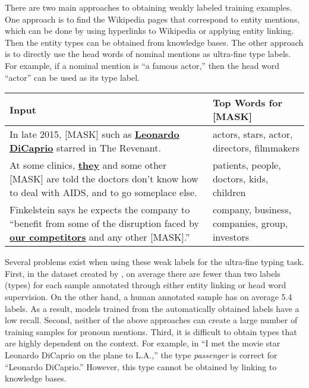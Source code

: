 \documentclass[11pt,a4paper]{article}
\begin{document}
There are two main approaches to obtaining weakly labeled training {examples}. One approach is to find the Wikipedia pages that correspond to entity mentions, which can be done by using hyperlinks to Wikipedia or applying entity linking. Then the entity types can be obtained from knowledge bases. The other approach is to directly use the head words of nominal mentions as ultra-fine type labels.
For example, if a nominal mention is ``a famous actor,'' then the head word ``actor'' can be used as its type label.

\begin{table*}
\centering
\begin{tabular}{p{10.2cm}p{4.7cm}}
\hline \textbf{Input} & \textbf{Top Words for [MASK]} \\ \hline
In late 2015, \colorbox{blue!30}{[MASK] such as} \underline{\textbf{Leonardo DiCaprio}} starred in The Revenant. & actors, stars, actor, directors, filmmakers \\
\hline
At some clinics, \underline{\textbf{they}} \colorbox{blue!30}{and some other [MASK]} are told the doctors don't know how to deal with AIDS, and to go someplace else. & patients, people, doctors, kids, children \\ \hline
Finkelstein says he expects the company to ``benefit from some of the disruption faced by \underline{\textbf{our competitors}} \colorbox{blue!30}{and any other [MASK]}.'' & company, business, companies, group, investors \\ \hline
\end{tabular}
\caption{\label{tab:weak-examples} Examples of constructed BERT MLM inputs for obtaining weak entity typing labels. Entity mentions are in bold and underlined. The texts highlighted with blue background are not in the original sentences. They are inserted to create inputs for BERT. The right column lists the five most probable words predicted by a pretrained BERT-Base-Cased MLM.}
\end{table*}

{Several problems exist when using these weak labels for the ultra-fine typing task.}
First, in the dataset created by \citet{choi2018ultra}, on average there are fewer than two labels (types) for each sample annotated through either entity linking or head word supervision. On the other hand, a human annotated sample has on average 5.4 labels. As a result, models trained from the automatically obtained labels have a low recall. Second, neither of the above approaches can create a large number of training samples for pronoun mentions. Third, it is difficult to obtain types that are highly dependent on the context. For example, in ``I met the movie star Leonardo DiCaprio on the plane to L.A.,'' the type \textit{passenger} is correct for ``Leonardo DiCaprio.'' However, this type cannot be obtained by linking to knowledge bases.
\end{document}
